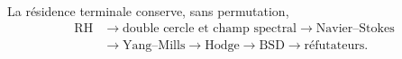 La résidence terminale conserve, sans permutation,
\[
\begin{aligned}
 \mathrm{RH}
 &\longrightarrow \text{double cercle et champ spectral}
 \longrightarrow \mathrm{Navier\text{--}Stokes}\\
 &\longrightarrow \mathrm{Yang\text{--}Mills}
 \longrightarrow \mathrm{Hodge}
 \longrightarrow \mathrm{BSD}
 \longrightarrow \text{réfutateurs}.
\end{aligned}
\]
